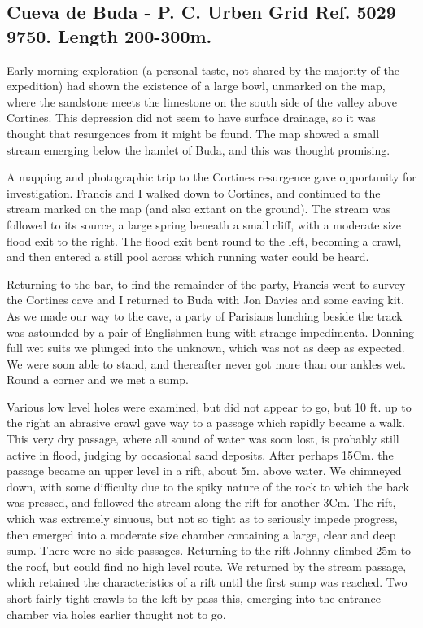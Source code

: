 \documentclass[11pt, a4paper, twoside]{memoir}
\begin{document}
\subsection*{Cueva de Buda - P. C. Urben Grid Ref. 5029 9750. Length 200-300m.}


Early morning exploration (a personal taste, not shared by the majority of the expedition) had shown the existence of a large bowl, unmarked on the map, where the sandstone meets the limestone on the south side of the valley above Cortines. This depression did not seem to have surface drainage, so it was thought that resurgences from it might be found. The map showed a small stream emerging below the hamlet of Buda, and this was thought promising.

A mapping and photographic trip to the Cortines resurgence gave opportunity for investigation. Francis and I walked down to Cortines, and continued to the stream marked on the map (and also extant on the ground). The stream was followed to its source, a large spring beneath a small cliff, with a moderate size flood exit to the right. The flood exit bent round to the left, becoming a crawl, and then entered a still pool across which running water could be heard.

Returning to the bar, to find the remainder of the party, Francis went to survey the Cortines cave and I returned to Buda with Jon Davies and some caving kit. As we made our way to the cave, a party of Parisians lunching beside the track was astounded by a pair of Englishmen hung with strange impedimenta. Donning full wet suits we plunged into the unknown, which was not as deep as expected. We were soon able to stand, and thereafter never got more than our ankles wet. Round a corner and we met a sump.

Various low level holes were examined, but did not appear to go, but 10 ft. up to the right an abrasive crawl gave way to a passage which rapidly became a walk. This very dry passage, where all sound of water was soon lost, is probably still active in flood, judging by occasional sand deposits. After perhaps 15Cm. the passage became an upper level in a rift, about 5m. above water. We chimneyed down, with some difficulty due to the spiky nature of the rock to which the back was pressed, and followed the stream along the rift for another 3Cm. The rift, which was extremely sinuous, but not so tight as to seriously impede progress, then emerged into a moderate size chamber containing a large, clear and deep sump. There were no side passages. Returning to the rift Johnny climbed 25m to the roof, but could find no high level route. We returned by the stream passage, which retained the characteristics of a rift until the first sump was reached. Two short fairly tight crawls to the left by-pass this, emerging into the entrance chamber via holes earlier thought not to go.
\end{document}
